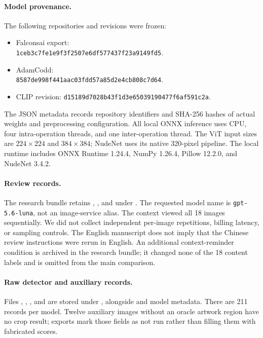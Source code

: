 \documentclass[11pt]{article}
\begin{document}
\paragraph{Model provenance.}
The following repositories and revisions were frozen:
\begin{itemize}\small
\item Falconsai export: \\
\texttt{1ceb3c7fe1e9f3f2507e}\allowbreak\texttt{6df577437f23a9149fd5}.
\item AdamCodd: \\
\texttt{8587de998f441aac03fd}\allowbreak\texttt{d57a85d2e4cb808c7d64}.
\item CLIP revision: \texttt{d15189d7028b43f1d3e6}\allowbreak\texttt{5039190477f6af591c2a}.
\end{itemize}
The JSON metadata records repository identifiers and SHA-256 hashes of actual
weights and preprocessing configuration. All local ONNX inference uses CPU,
four intra-operation threads, and one inter-operation thread. The ViT input
sizes are $224\times224$ and $384\times384$; NudeNet uses its native 320-pixel
pipeline. The local runtime includes ONNX Runtime 1.24.4, NumPy 1.26.4,
Pillow 12.2.0, and NudeNet 3.4.2.

\paragraph{Review records.}
The research bundle retains ,
, and  under
. The requested model name is
\texttt{gpt-5.6-luna}, not an image-service alias. The context viewed all 18
images sequentially. We did not collect independent per-image repetitions,
billing latency, or sampling controls. The English manuscript does not imply
that the Chinese review instructions were rerun in English.
An additional context-reminder condition is archived in the research bundle;
it changed none of the 18 content labels and is omitted from the main comparison.

\paragraph{Raw detector and auxiliary records.}
Files , ,
, and  are stored
under , alongside 
and model metadata. There are 211 records per model. Twelve auxiliary images
without an oracle artwork region have no crop result; exports mark those
fields as not run rather than filling them with fabricated scores.
\end{document}
